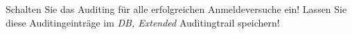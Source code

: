     \item Schalten Sie das Auditing für alle erfolgreichen Anmeldeversuche ein! Lassen Sie diese Auditingeinträge im \textit{DB, Extended} Auditingtrail speichern!
